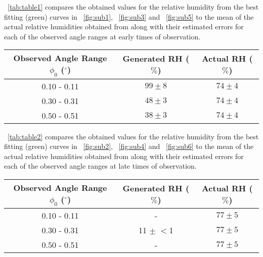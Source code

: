 \documentclass{article}
\newcommand{\figref}[2][\figurename~]{#1\ref{#2}}
\newcommand{\tabref}[2][\tablename~]{#1\ref{#2}}
\begin{document}
\vspace{2mm}
\noindent
\tabref{tab:table1} compares the obtained values for the relative humidity from the best fitting (green) curves in \figref{fig:sub1}, \figref{fig:sub3} and \figref{fig:sub5} to the mean of the actual relative humidities obtained from \cite{Web01} along with their estimated errors for each of the observed angle ranges at early times of observation.

\vspace{5mm}
\begin{table*}[h]
\centering %
\caption{A table comparing generated relative humidities (RH) from an interpolative and least squares method for the various different observed angle, $\phi_0$ ranges investigated to the mean of the actual RH values given by \cite{Web01} for the early times of observation (first 5000s).}
\label{tab:table1}
\begin{tabular}{|c|c|c|}
\hline
Observed Angle Range $\phi_0$ ($^{\circ}$) & Generated RH ($\%$) & Actual RH ($\%$) \cite{Web01} \\
\hline
0.10 - 0.11 & $99 \pm 8$ & $74 \pm 4$ \\
\hline
0.30 - 0.31 & $48 \pm 3$ & $74 \pm 4$ \\
\hline
0.50 - 0.51 & $38 \pm 3$ & $74 \pm 4$ \\
\hline
\end{tabular}
\end{table*}

\vspace{2mm}
\noindent
\tabref{tab:table2} compares the obtained values for the relative humidity from the best fitting (green) curves in \figref{fig:sub2}, \figref{fig:sub4} and \figref{fig:sub6} to the mean of the actual relative humidities obtained from \cite{Web01} along with their estimated errors for each of the observed angle ranges at late times of observation.

\vspace{5mm}
\begin{table*}[h]
\centering %
\caption{A table comparing generated relative humidities (RH) from an interpolative and least squares method for the various different observed angle, $\phi_0$ ranges investigated to the mean of the actual RH values given by \cite{Web01} for the late times of observation (last 5000s).}
\label{tab:table2}
\begin{tabular}{|c|c|c|}
\hline
Observed Angle Range $\phi_0$ ($^{\circ}$) & Generated RH ($\%$) & Actual RH ($\%$) \cite{Web01} \\
\hline
0.10 - 0.11 & - & $77 \pm 5$ \\
\hline
0.30 - 0.31 & 11 $\pm$ $<$1 & $77 \pm 5$ \\
\hline
0.50 - 0.51 & - & $77 \pm 5$ \\
\hline
\end{tabular}
\end{table*}
\end{document}
